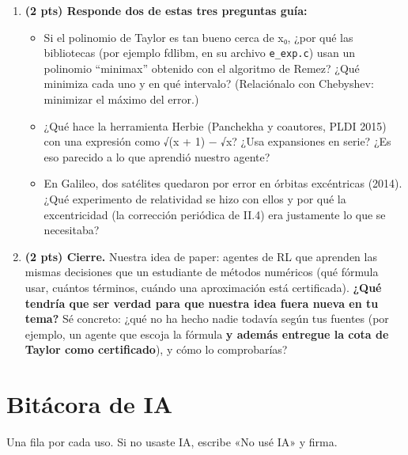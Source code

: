 \begin{enumerate}
\def\labelenumi{\arabic{enumi}.}
\setcounter{enumi}{2}
\tightlist
\item
  \textbf{(2 pts) Responde dos de estas tres preguntas guía:}

  \begin{itemize}
  \tightlist
  \item
    Si el polinomio de Taylor es tan bueno cerca de x₀, ¿por qué las bibliotecas (por ejemplo fdlibm, en su archivo \texttt{e\_exp.c}) usan un polinomio ``minimax'' obtenido con el algoritmo de Remez? ¿Qué minimiza cada uno y en qué intervalo? (Relaciónalo con Chebyshev: minimizar el máximo del error.)
  \item
    ¿Qué hace la herramienta Herbie (Panchekha y coautores, PLDI 2015) con una expresión como √(x + 1) − √x? ¿Usa expansiones en serie? ¿Es eso parecido a lo que aprendió nuestro agente?
  \item
    En Galileo, dos satélites quedaron por error en órbitas excéntricas (2014). ¿Qué experimento de relatividad se hizo con ellos y por qué la excentricidad (la corrección periódica de II.4) era justamente lo que se necesitaba?
  \end{itemize}
\item
  \textbf{(2 pts) Cierre.} Nuestra idea de paper: agentes de RL que aprenden las mismas decisiones que un estudiante de métodos numéricos (qué fórmula usar, cuántos términos, cuándo una aproximación está certificada). \textbf{¿Qué tendría que ser verdad para que nuestra idea fuera nueva en tu tema?} Sé concreto: ¿qué no ha hecho nadie todavía según tus fuentes (por ejemplo, un agente que escoja la fórmula \textbf{y además entregue la cota de Taylor como certificado}), y cómo lo comprobarías?
\end{enumerate}

\section{Bitácora de IA}

Una fila por cada uso. Si no usaste IA, escribe «No usé IA» y firma.

